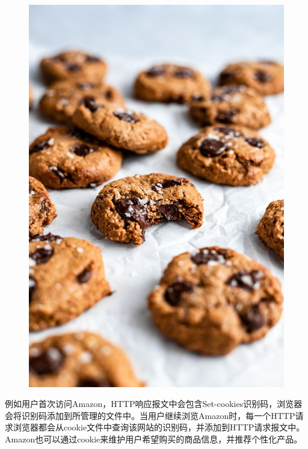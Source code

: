 \begin{figure}[H]
    \centering
    \includegraphics[scale=0.15]{img/C2/2-3/1.png}
\end{figure}

例如用户首次访问Amazon，HTTP响应报文中会包含Set-cookies识别码，浏览器会将识别码添加到所管理的文件中。当用户继续浏览Amazon时，每一个HTTP请求浏览器都会从cookie文件中查询该网站的识别码，并添加到HTTP请求报文中。Amazon也可以通过cookie来维护用户希望购买的商品信息，并推荐个性化产品。

